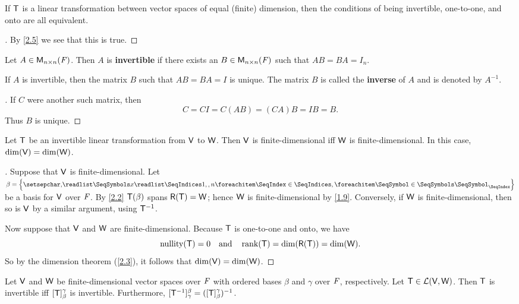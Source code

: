 \begin{cor}\label{2.4.2}
	If \(\mathsf{T}\) is a linear transformation between vector spaces of equal (finite) dimension, then the conditions of being invertible, one-to-one, and onto are all equivalent.
\end{cor}

\begin{proof}[]
	By \cref{2.5} we see that this is true.
\end{proof}

\begin{defn}\label{2.4.3}
	Let \(A \in \ms[n][n][\F]\).
	Then \(A\) is \textbf{invertible} if there exists an \(B \in \ms[n][n][\F]\) such that \(AB = BA = I_n\).
\end{defn}

\begin{cor}\label{2.4.4}
	If \(A\) is invertible, then the matrix \(B\) such that \(AB = BA = I\) is unique.
	The matrix \(B\) is called the \textbf{inverse} of \(A\) and is denoted by \(A^{-1}\).
\end{cor}

\begin{proof}[]
	If \(C\) were another such matrix, then
	\[
		C = CI = C(AB) = (CA)B = IB = B.
	\]
	Thus \(B\) is unique.
\end{proof}

\begin{lem}\label{2.4.5}
	Let \(\mathsf{T}\) be an invertible linear transformation from \(\mathsf{V}\) to \(\mathsf{W}\).
	Then \(\mathsf{V}\) is finite-dimensional iff \(\mathsf{W}\) is finite-dimensional.
	In this case, \(\dim(\mathsf{V}) = \dim(\mathsf{W})\).
\end{lem}

\begin{proof}[]
	Suppose that \(\mathsf{V}\) is finite-dimensional.
	Let \(\beta = \set{\seq{x}{1,,n}}\) be a basis for \(\mathsf{V}\) over \(\mathit{F}\).
	By \cref{2.2} \(\mathsf{T}(\beta)\) spans \(\rg{\T} = \W\);
	hence \(\mathsf{W}\) is finite-dimensional by \cref{1.9}.
	Conversely, if \(\mathsf{W}\) is finite-dimensional, then so is \(\mathsf{V}\) by a similar argument, using \(\mathsf{T}^{-1}\).

	Now suppose that \(\mathsf{V}\) and \(\mathsf{W}\) are finite-dimensional.
	Because \(\mathsf{T}\) is one-to-one and onto, we have
	\[
		\nt{\T} = 0 \quad \text{and} \quad \rk{\T} = \dim(\rg{\T}) = \dim(\W).
	\]
	So by the dimension theorem (\cref{2.3}), it follows that \(\dim(\mathsf{V}) = \dim(\mathsf{W})\).
\end{proof}

\begin{thm}\label{2.18}
	Let \(\mathsf{V}\) and \(\mathsf{W}\) be finite-dimensional vector spaces over \(\mathit{F}\) with ordered bases \(\beta\) and \(\gamma\) over \(\mathit{F}\), respectively.
	Let \(\mathsf{T} \in \mathcal{L}(\mathsf{V}, \mathsf{W})\).
	Then \(\mathsf{T}\) is invertible iff \([\mathsf{T}]_{\beta}^{\gamma}\) is invertible.
	Furthermore, \([\mathsf{T}^{-1}]_{\gamma}^{\beta} = ([\mathsf{T}]_{\beta}^{\gamma})^{-1}\).
\end{thm}

